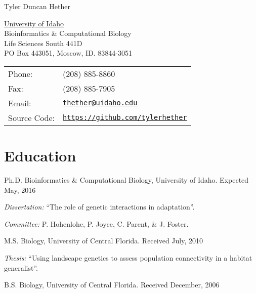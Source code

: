 \documentclass[letterpaper]{article}
\def\name{Tyler Duncan Hether}
\renewenvironment{itemize}{
  \begin{list}{}{
    \setlength{\leftmargin}{1.5em}
  }
}{
  \end{list}
}
\begin{document}
{\huge \name}


\vspace{0.25in}

\begin{minipage}{0.45\linewidth}
  \href{https://www.uidaho.edu/}{University of Idaho} \\
  Bioinformatics \& Computational Biology \\
  Life Sciences South 441D \\
  PO Box 443051, Moscow, ID. 83844-3051
\end{minipage}
\begin{minipage}{0.45\linewidth}
  \begin{tabular}{ll}
    Phone: & (208) 885-8860 \\
    Fax: &  (208) 885-7905 \\
    Email: & \href{mailto:tyler.thether@uidaho.edu}{\tt thether@uidaho.edu} \\
    Source Code: & \href{https://github.com/tylerhether}{\tt https://github.com/tylerhether} \\
  \end{tabular}
\end{minipage}





\section*{Education}

\begin{itemize}
  \item Ph.D. Bioinformatics \& Computational Biology, University of Idaho. Expected May, 2016
    \begin{itemize}
    \item \emph{Dissertation:} ``The role of genetic interactions in adaptation''.
    \item \emph{Committee:} P. Hohenlohe, P. Joyce, C. Parent, \& J. Foster.
    \end{itemize}
  \item M.S. Biology, University of Central Florida.
    Received July, 2010
    \begin{itemize}
    \item \emph{Thesis:} ``Using landscape genetics to assess population connectivity in a habitat generalist''.
    \end{itemize}
  \item B.S. Biology, University of Central Florida.
    Received December, 2006
\end{itemize}
\end{document}

